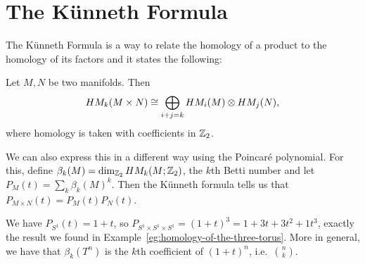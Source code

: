 \section{The Künneth Formula}
The Künneth Formula is a way to relate the homology of a product to the homology of its factors and it states the following:
\begin{prop}
    Let $M, N$ be two manifolds. Then
    \[
        \HMf[k]{M \times N} \cong
        \bigoplus_{i+j  = k} \HMf[i]{M} \otimes \HMf[j]{N}
    ,\] 
where homology is taken with coefficients in $ \Z_2$.
\end{prop}
We can also express this in a different way using the Poincaré polynomial.
For this, define $\beta_k(M) = \dim_{\Z_2} \HMf[k]{M;\Z_2}$, the $k$th Betti number and let $P_M(t) = \sum_k \beta_k(M) ^{k}$.
Then the Künneth formula tells us that $P_{M \times N}(t) = P_M(t) P_N(t)$.
\begin{eg}
    We have $P_{S^{1}}(t) = 1 + t$, so $P_{S^{1}\times S^{1}\times S^{1}} = (1 + t)^3 = 1 + 3t + 3t^2 + 1t^3$, exactly the result we found in Example~\ref{eg:homology-of-the-three-torus}.
    More in general, we have that $\beta_k(T^{n})$ is the $k$th coefficient of $(1+t)^{n}$, i.e.\ $\binom{n}{k}$.
\end{eg}
